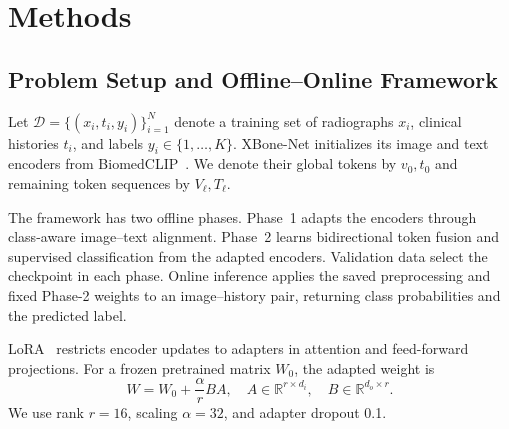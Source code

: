 \section{Methods}
\subsection{Problem Setup and Offline--Online Framework}
Let $\mathcal D=\{(x_i,t_i,y_i)\}_{i=1}^N$ denote a training set of radiographs $x_i$, clinical histories $t_i$, and labels $y_i\in\{1,\ldots,K\}$. XBone-Net initializes its image and text encoders from BiomedCLIP~\cite{BiomedCLIP}. We denote their global tokens by $v_0,t_0$ and remaining token sequences by $V_\ell,T_\ell$.

The framework has two offline phases. Phase~1 adapts the encoders through class-aware image--text alignment. Phase~2 learns bidirectional token fusion and supervised classification from the adapted encoders. Validation data select the checkpoint in each phase. Online inference applies the saved preprocessing and fixed Phase-2 weights to an image--history pair, returning class probabilities and the predicted label.

LoRA~\cite{Hu2022LoRA} restricts encoder updates to adapters in attention and feed-forward projections. For a frozen pretrained matrix $W_0$, the adapted weight is
\begin{equation}
W=W_0+\frac{\alpha}{r}BA,\quad
A\in\mathbb R^{r\times d_i},\quad B\in\mathbb R^{d_o\times r}.
\label{eq:lora}
\end{equation}
We use rank $r=16$, scaling $\alpha=32$, and adapter dropout 0.1.

